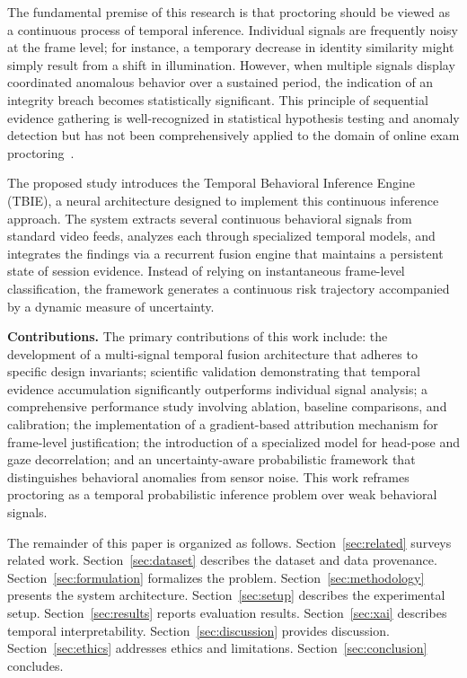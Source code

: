\documentclass[journal]{IEEEtran}
\begin{document}
The fundamental premise of this research is that proctoring should be viewed as a continuous process of temporal inference. Individual signals are frequently noisy at the frame level; for instance, a temporary decrease in identity similarity might simply result from a shift in illumination. However, when multiple signals display coordinated anomalous behavior over a sustained period, the indication of an integrity breach becomes statistically significant. This principle of sequential evidence gathering is well-recognized in statistical hypothesis testing and anomaly detection but has not been comprehensively applied to the domain of online exam proctoring~\cite{Wald1945, Liu2018, Chandola2009}.

The proposed study introduces the Temporal Behavioral Inference Engine (TBIE), a neural architecture designed to implement this continuous inference approach. The system extracts several continuous behavioral signals from standard video feeds, analyzes each through specialized temporal models, and integrates the findings via a recurrent fusion engine that maintains a persistent state of session evidence. Instead of relying on instantaneous frame-level classification, the framework generates a continuous risk trajectory accompanied by a dynamic measure of uncertainty.

\medskip
\noindent\textbf{Contributions.} The primary contributions of this work include: the development of a multi-signal temporal fusion architecture that adheres to specific design invariants; scientific validation demonstrating that temporal evidence accumulation significantly outperforms individual signal analysis; a comprehensive performance study involving ablation, baseline comparisons, and calibration; the implementation of a gradient-based attribution mechanism for frame-level justification; the introduction of a specialized model for head-pose and gaze decorrelation; and an uncertainty-aware probabilistic framework that distinguishes behavioral anomalies from sensor noise. This work reframes proctoring as a temporal probabilistic inference problem over weak behavioral signals.

\noindent The remainder of this paper is organized as follows. Section~\ref{sec:related} surveys related work. Section~\ref{sec:dataset} describes the dataset and data provenance. Section~\ref{sec:formulation} formalizes the problem. Section~\ref{sec:methodology} presents the system architecture. Section~\ref{sec:setup} describes the experimental setup. Section~\ref{sec:results} reports evaluation results. Section~\ref{sec:xai} describes temporal interpretability. Section~\ref{sec:discussion} provides discussion. Section~\ref{sec:ethics} addresses ethics and limitations. Section~\ref{sec:conclusion} concludes.
\end{document}
